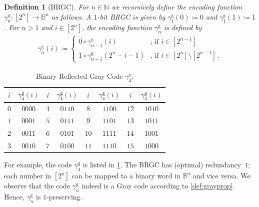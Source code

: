 \documentclass[9pt,journal,compsoc]{IEEEtran}
\newtheorem{definition}[theorem]{Definition}
\theoremstyle{remark}
\newcommand{\IN}{\mathbb{N}}
\newcommand{\IB}{\mathbb{B}}
\newcommand{\gBRGC}[1]{\gamma_{#1}^{\operatorname{g}}}
\begin{document}
\begin{definition}[BRGC]\label{def:BRGC}
  For $n\in\IN$ we recursively define the encoding function $\gBRGC{n}\colon[2^n]\rightarrow\IB^n$
  as follows.
  A $1$-bit BRGC is given by $\gBRGC{1}(0)\coloneqq 0$ and $\gBRGC{1}(1)\coloneqq 1$.
  For $n>1$ and $i\in[2^n]$, the encoding function $\gBRGC{n}$ is defined by
  \begin{align*}
    \gBRGC{n}(i)\coloneqq
    \begin{cases}
      0 \circ \gBRGC{n-1}(i) & \text{, if } i\in[2^{n-1}]\\
      1 \circ \gBRGC{n-1}(2^n - i - 1) & \text{, if } i\in[2^n]\setminus[2^{n-1}]\,.
    \end{cases}
  \end{align*}
\end{definition}

\begin{table}
  \centering
  \caption{Binary Reflected Gray Code $\gBRGC{4}$.}
  \begin{tabular}{cccccccc}
    $i$ & $\gBRGC{4}(i)$ & $i$ & $\gBRGC{4}(i)$ & $i$ & $\gBRGC{4}(i)$ & $i$ & $\gBRGC{4}(i)$ \\ \hline
    $0$ & $0000$ & $4$ & $0110$ & $8$ & $1100$ & $12$ & $1010$ \\
    $1$ & $0001$ & $5$ & $0111$ & $9$ & $1101$ & $13$ & $1011$ \\
    $2$ & $0011$ & $6$ & $0101$ & $10$ & $1111$ & $14$ & $1001$ \\
    $3$ & $0010$ & $7$ & $0100$ & $11$ & $1110$ & $15$ & $1000$
  \end{tabular}
  \label{tab:brgc}
\end{table}

For example, the code $\gBRGC{4}$ is listed in \cref{tab:brgc}.
The BRGC has (optimal) redundancy~$1$; each number in $[2^n]$
  can be mapped to a binary word in $\IB^n$ and vice versa.
We observe that the code $\gBRGC{n}$ indeed is a Gray code 
  according to \cref{def:grayprop}.
Hence, $\gBRGC{n}$ is $1$-preserving.
\end{document}
